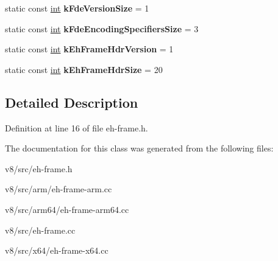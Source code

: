 \begin{DoxyCompactItemize}
static const \mbox{\hyperlink{classint}{int}} {\bfseries k\+Fde\+Version\+Size} = 1
\item 
\mbox{\label{classv8_1_1internal_1_1EhFrameConstants_ac6c6e8afb00f2866bb50ff256ff3eee5}} 
static const \mbox{\hyperlink{classint}{int}} {\bfseries k\+Fde\+Encoding\+Specifiers\+Size} = 3
\item 
\mbox{\label{classv8_1_1internal_1_1EhFrameConstants_ab9121c30bb0f47852d32f749b2c278c9}} 
static const \mbox{\hyperlink{classint}{int}} {\bfseries k\+Eh\+Frame\+Hdr\+Version} = 1
\item 
\mbox{\label{classv8_1_1internal_1_1EhFrameConstants_aad7375f86fd4061ea38d398b580eb72b}} 
static const \mbox{\hyperlink{classint}{int}} {\bfseries k\+Eh\+Frame\+Hdr\+Size} = 20
\end{DoxyCompactItemize}


\subsection{Detailed Description}


Definition at line 16 of file eh-\/frame.\+h.



The documentation for this class was generated from the following files\+:\begin{DoxyCompactItemize}
\item 
v8/src/eh-\/frame.\+h\item 
v8/src/arm/eh-\/frame-\/arm.\+cc\item 
v8/src/arm64/eh-\/frame-\/arm64.\+cc\item 
v8/src/eh-\/frame.\+cc\item 
v8/src/x64/eh-\/frame-\/x64.\+cc\end{DoxyCompactItemize}
